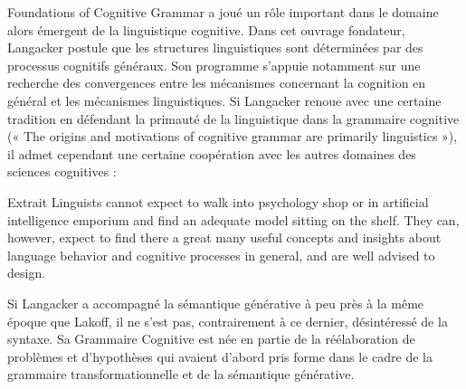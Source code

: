 Foundations of Cognitive Grammar a joué un rôle important dans le domaine alors émergent de la linguistique cognitive. Dans cet ouvrage fondateur, Langacker postule que les structures linguistiques sont déterminées par des processus cognitifs généraux. Son programme s'appuie notamment sur une recherche des convergences entre les mécanismes concernant la cognition en général et les mécanismes linguistiques. Si Langacker renoue avec une certaine tradition en défendant la primauté de la linguistique dans la grammaire cognitive (« The origins and motivations of cognitive grammar are primarily linguistics »), il admet cependant une certaine coopération avec les autres domaines des sciences cognitives : 
\begin{lecture}{Extrait}
Linguists cannot expect to walk into psychology shop or in artificial intelligence emporium and find an adequate model sitting on the shelf. They can, however, expect to find there a great many useful concepts and insights about language behavior and cognitive processes in general, and are well advised to design.
\end{lecture}
 Si Langacker a accompagné la sémantique générative à peu près à la même époque que Lakoff, il ne s’est pas, contrairement à ce dernier, désintéressé de la syntaxe. Sa Grammaire Cognitive est née en partie de la réélaboration de problèmes et d’hypothèses qui avaient d’abord pris forme dans le cadre de la grammaire transformationnelle et de la sémantique générative.\par


